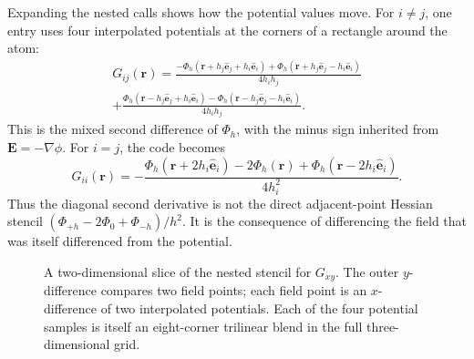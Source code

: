 \documentclass[11pt]{article}
\begin{document}
Expanding the nested calls shows how the potential values move. For \(i\ne j\),
one entry uses four interpolated potentials at the corners of a rectangle
around the atom:
\[
\begin{aligned}
  G_{ij}(\bm r) =
  \frac{
     -\Phi_h(\bm r+h_j\hat{\bm e}_j+h_i\hat{\bm e}_i)
     +\Phi_h(\bm r+h_j\hat{\bm e}_j-h_i\hat{\bm e}_i)}
       {4h_i h_j} \\[0.2em]
  +\frac{
      \Phi_h(\bm r-h_j\hat{\bm e}_j+h_i\hat{\bm e}_i)
     -\Phi_h(\bm r-h_j\hat{\bm e}_j-h_i\hat{\bm e}_i)}
       {4h_i h_j}.
\end{aligned}
\]
This is the mixed second difference of \(\Phi_h\), with the minus sign inherited
from \(\bm E=-\nabla\phi\). For \(i=j\), the code becomes
\[
  G_{ii}(\bm r)=
  -\frac{\Phi_h(\bm r+2h_i\hat{\bm e}_i)
          -2\Phi_h(\bm r)
          +\Phi_h(\bm r-2h_i\hat{\bm e}_i)}
         {4h_i^2}.
\]
Thus the diagonal second derivative is not the direct adjacent-point Hessian
stencil \((\Phi_{+h}-2\Phi_0+\Phi_{-h})/h^2\). It is the consequence of
differencing the field that was itself differenced from the potential.

\begin{figure}[ht]
\centering
{}
\caption{A two-dimensional slice of the nested stencil for \(G_{xy}\). The
outer \(y\)-difference compares two field points; each field point is an
\(x\)-difference of two interpolated potentials. Each of the four potential
samples is itself an eight-corner trilinear blend in the full three-dimensional
grid.}
\end{figure}
\end{document}
